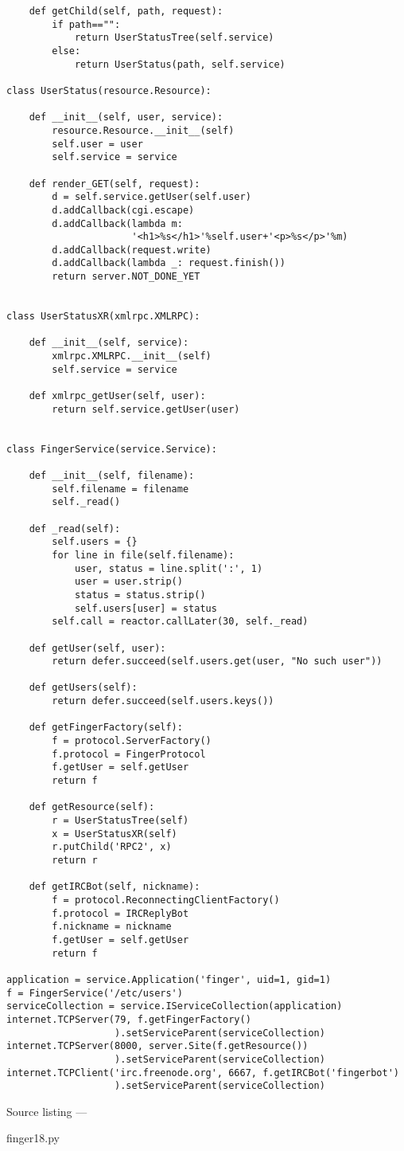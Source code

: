 \begin{verbatim}
    def getChild(self, path, request):
        if path=="":
            return UserStatusTree(self.service)
        else:
            return UserStatus(path, self.service)

class UserStatus(resource.Resource):

    def __init__(self, user, service):
        resource.Resource.__init__(self)
        self.user = user
        self.service = service

    def render_GET(self, request):
        d = self.service.getUser(self.user)
        d.addCallback(cgi.escape)
        d.addCallback(lambda m:
                      '<h1>%s</h1>'%self.user+'<p>%s</p>'%m)
        d.addCallback(request.write)
        d.addCallback(lambda _: request.finish())
        return server.NOT_DONE_YET


class UserStatusXR(xmlrpc.XMLRPC):

    def __init__(self, service):
        xmlrpc.XMLRPC.__init__(self)
        self.service = service

    def xmlrpc_getUser(self, user):
        return self.service.getUser(user)


class FingerService(service.Service):

    def __init__(self, filename):
        self.filename = filename
        self._read()

    def _read(self):
        self.users = {}
        for line in file(self.filename):
            user, status = line.split(':', 1)
            user = user.strip()
            status = status.strip()
            self.users[user] = status
        self.call = reactor.callLater(30, self._read)

    def getUser(self, user):
        return defer.succeed(self.users.get(user, "No such user"))

    def getUsers(self):
        return defer.succeed(self.users.keys())

    def getFingerFactory(self):
        f = protocol.ServerFactory()
        f.protocol = FingerProtocol
        f.getUser = self.getUser
        return f

    def getResource(self):
        r = UserStatusTree(self)
        x = UserStatusXR(self)
        r.putChild('RPC2', x)
        return r

    def getIRCBot(self, nickname):
        f = protocol.ReconnectingClientFactory()
        f.protocol = IRCReplyBot
        f.nickname = nickname
        f.getUser = self.getUser
        return f

application = service.Application('finger', uid=1, gid=1)
f = FingerService('/etc/users')
serviceCollection = service.IServiceCollection(application)
internet.TCPServer(79, f.getFingerFactory()
                   ).setServiceParent(serviceCollection)
internet.TCPServer(8000, server.Site(f.getResource())
                   ).setServiceParent(serviceCollection)
internet.TCPClient('irc.freenode.org', 6667, f.getIRCBot('fingerbot')
                   ).setServiceParent(serviceCollection)
\end{verbatim}\parbox[b]{\linewidth}{\begin{center}Source listing --- \begin{em}finger18.py\end{em}\end{center}}